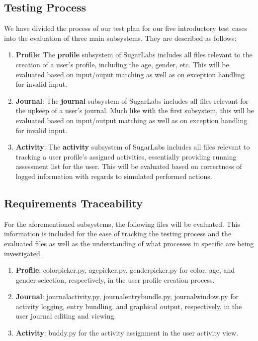 \documentclass{article}
\begin{document}
\subsection{Testing Process}
We have divided the process of our test plan for our five introductory test cases into the evaluation of three main subsystems. They are described as follows:
\begin{enumerate}
\itemsep-0.5em
\item \textbf{Profile}: The \textbf{profile} subsystem of SugarLabs includes all files relevant to the creation of a user's profile, including the age, gender, etc. This will be evaluated based on input/ouput matching as well as on exception handling for invalid input.
\item \textbf{Journal}: The \textbf{journal} subsystem of SugarLabs includes all files relevant for the upkeep of a user's journal. Much like with the first subsystem, this will be evaluated based on input/output matching as well as on exception handling for invalid input.
\item \textbf{Activity}: The \textbf{activity} subsystem of SugarLabs includes all files relevant to tracking a user profile's assigned activities, essentially providing running assessment list for the user. This will be evaluated based on correctness of logged information with regards to simulated performed actions.
\end{enumerate}
\subsection{Requirements Traceability}
\label{ReqTrace}
For the aforementioned subsystems, the following files will be evaluated. This information is included for the ease of tracking the testing process and the evaluated files as well as the understanding of what processes in specific are being investigated.
\begin{enumerate}
\itemsep-0.5em
\item \textbf{Profile}: colorpicker.py, agepicker.py, genderpicker.py for color, age, and gender selection, respectively, in the user profile creation process.
\item \textbf{Journal}: journalactivity.py, journalentrybundle.py, journalwindow.py for activity logging, entry bundling, and graphical output, respectively, in the user journal editing and viewing.
\item \textbf{Activity}: buddy.py for the activity assignment in the user activity view.
\end{enumerate}
\end{document}
